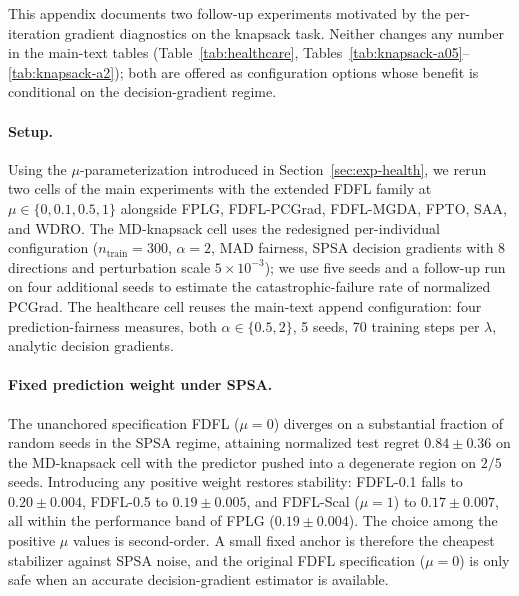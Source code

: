 \documentclass[ijoc,sglanonrev]{informs4}
\begin{document}
This appendix documents two follow-up experiments motivated by the
per-iteration gradient diagnostics on the knapsack task. Neither
changes any number in the main-text tables
(Table~\ref{tab:healthcare}, Tables~\ref{tab:knapsack-a05}--\ref{tab:knapsack-a2});
both are offered as configuration options whose benefit is
conditional on the decision-gradient regime.

\paragraph{Setup.}
Using the $\mu$-parameterization introduced in
Section~\ref{sec:exp-health}, we rerun two cells of the main
experiments with the extended FDFL family at $\mu\in\{0,0.1,0.5,1\}$
alongside FPLG, FDFL-PCGrad, FDFL-MGDA, FPTO, SAA, and WDRO. The
MD-knapsack cell uses the redesigned per-individual configuration
($n_{\mathrm{train}} = 300$, $\alpha = 2$, MAD fairness, SPSA
decision gradients with 8 directions and perturbation scale
$5\times 10^{-3}$); we use five seeds and a follow-up run on four
additional seeds to estimate the catastrophic-failure rate of
normalized PCGrad. The healthcare cell reuses the main-text append
configuration: four prediction-fairness measures, both
$\alpha\in\{0.5,2\}$, 5 seeds, 70 training steps per $\lambda$,
analytic decision gradients.

\paragraph{Fixed prediction weight under SPSA.}
The unanchored specification FDFL ($\mu = 0$) diverges on a
substantial fraction of random seeds in the SPSA regime,
attaining normalized test regret $0.84 \pm 0.36$ on the MD-knapsack
cell with the predictor pushed into a degenerate region on
$2/5$ seeds. Introducing any positive weight restores stability:
FDFL-0.1 falls to $0.20 \pm 0.004$, FDFL-0.5 to
$0.19 \pm 0.005$, and FDFL-Scal ($\mu = 1$) to $0.17 \pm 0.007$,
all within the performance band of FPLG
($0.19 \pm 0.004$). The choice among the positive $\mu$ values is
second-order. A small fixed anchor is therefore the cheapest
stabilizer against SPSA noise, and the original FDFL
specification ($\mu = 0$) is only safe when an accurate
decision-gradient estimator is available.
\end{document}
